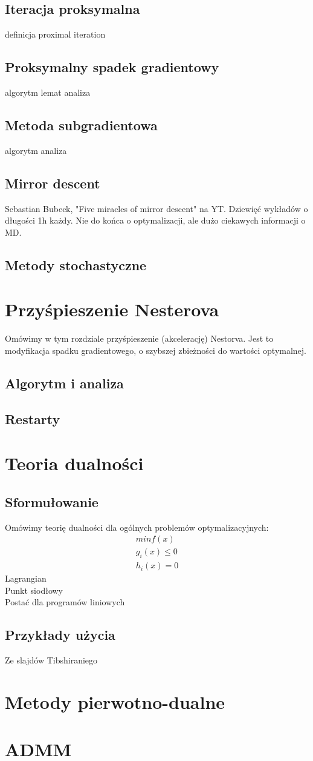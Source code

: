 \documentclass[10pt,a4paper,draft]{report}
\begin{document}
\section{Iteracja proksymalna}
definicja
proximal iteration

\section{Proksymalny spadek gradientowy}
algorytm
lemat
analiza
\section{Metoda subgradientowa}
algorytm
analiza

\section{Mirror descent}

Sebastian Bubeck, "Five miracles of mirror descent" na YT. Dziewięć wykładów o długości 1h każdy. Nie do końca o optymalizacji, ale dużo ciekawych informacji o MD.

\section{Metody stochastyczne}

\chapter{Przyśpieszenie Nesterova}
Omówimy w tym rozdziale przyśpieszenie (akcelerację) Nestorva. Jest to modyfikacja spadku gradientowego, o szybszej zbieżności do wartości optymalnej.
\section{Algorytm i analiza}

\section{Restarty}


\chapter{Teoria dualności}
\section{Sformułowanie}
Omówimy teorię dualności dla ogólnych problemów optymalizacyjnych:
\[
\begin{array}{c}
min f(x) \\
g_i(x) \leq 0 \\
h_i(x) = 0
\end{array}
\]
Lagrangian \\
Punkt siodłowy \\
Postać dla programów liniowych
\section{Przykłady użycia}
Ze slajdów Tibshiraniego

\chapter{Metody pierwotno-dualne}

\chapter{ADMM}
\end{document}
